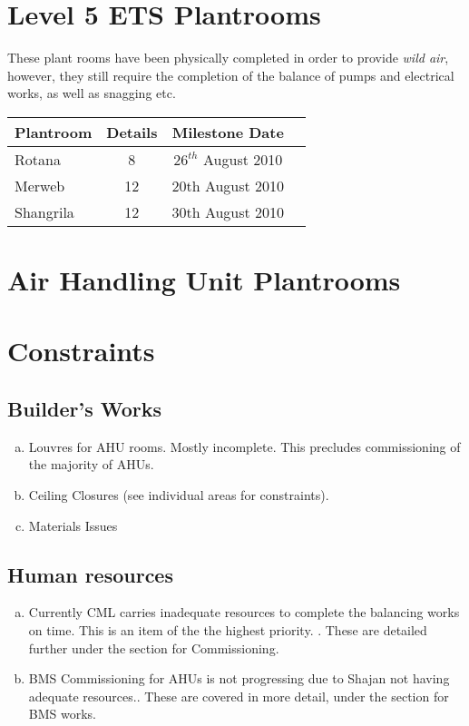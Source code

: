 \section{Level 5 ETS Plantrooms}
These plant rooms have been physically completed in order to provide \emph{wild air}, however, they still require the completion of the balance of pumps and electrical works, as well as snagging etc.

\begin{center} 
    \begin{tabular}{lccl}
      \toprule
      Plantroom   &  Details & Milestone Date  \\
      \midrule
      Rotana       &  8   &  $26^{th}$ August 2010  \\
      Merweb      &  12 &  20th August 2010  \\
      Shangrila    &  12 &  30th August 2010  \\
      \bottomrule
    \end{tabular}
 
  \end{center}

\section{Air Handling Unit Plantrooms}


\section{Constraints}

\subsection{Builder's Works}
\begin{enumerate}[a)]
\item Louvres for AHU rooms. Mostly incomplete. This precludes commissioning of the majority of AHUs. 
\item Ceiling Closures (see individual areas for constraints). 
\item Materials Issues
\end{enumerate}

\subsection{Human resources}
\begin{enumerate}[a.)]
\item       Currently CML carries inadequate resources to complete the balancing works on time. This is an item of the the highest priority. . These are detailed further under the section for Commissioning.
\item BMS Commissioning for AHUs is not progressing due to Shajan not having adequate resources.. These are covered in more detail, under the section for BMS works.
\end{enumerate}

